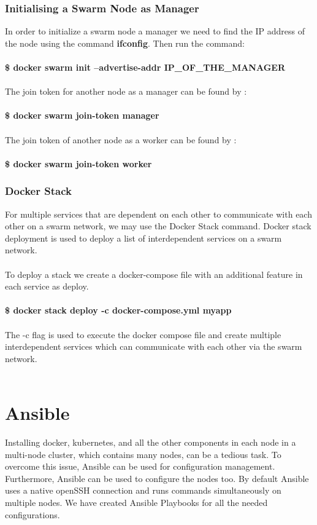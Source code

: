 \documentclass[12pt]{report}
\begin{document}
\subsection{Initialising a Swarm Node as Manager}
In order to initialize a swarm node a manager we need to find the IP address of the node using the command \textbf{ifconfig}. Then run the command:\\\\
\textbf{\$ docker swarm init --advertise-addr IP\_OF\_THE\_MANAGER}\\\\
The join token for another node as a manager can be found by :\\\\
\textbf{\$ docker swarm join-token manager\\\\}
The join token of another node as a worker can be found by :\\\\
\textbf{\$ docker swarm join-token worker}
\subsection{Docker Stack}
For multiple services that are dependent on each other to communicate with each other on a swarm network, we may use the Docker Stack command. Docker stack deployment is used to deploy a list of interdependent services on a swarm network.\\\\
To deploy a stack we create a docker-compose file with an additional feature in each service as deploy.\\\\
\textbf{\$ docker stack deploy -c docker-compose.yml myapp}\\\\
The -c flag is used to execute the docker compose file and create multiple interdependent services which can communicate with each other via the swarm network.\\\\
\chapter{Ansible}
Installing docker, kubernetes, and all the other components in each node in a multi-node cluster, which contains many nodes, can be a tedious task. To overcome this issue, Ansible can be used for configuration management. Furthermore, Ansible can be used to configure the nodes too. By default Ansible uses a native openSSH connection and runs commands simultaneously on multiple nodes. We have created Ansible Playbooks for all the needed configurations.
\end{document}

